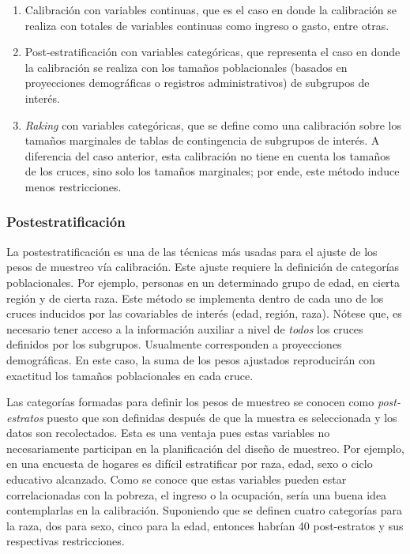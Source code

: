 \documentclass[
  12pt,
  spanish,
]{book}
\providecommand{\tightlist}{%
  \setlength{\itemsep}{0pt}\setlength{\parskip}{0pt}}
\begin{document}
\begin{enumerate}
\def\labelenumi{\arabic{enumi}.}
\tightlist
\item
  Calibración con variables continuas, que es el caso en donde la calibración se realiza con totales de variables continuas como ingreso o gasto, entre otras.
\item
  Post-estratificación con variables categóricas, que representa el caso en donde la calibración se realiza con los tamaños poblacionales (basados en proyecciones demográficas o registros administrativos) de subgrupos de interés.
\item
  \emph{Raking} con variables categóricas, que se define como una calibración sobre los tamaños marginales de tablas de contingencia de subgrupos de interés. A diferencia del caso anterior, esta calibración no tiene en cuenta los tamaños de los cruces, sino solo los tamaños marginales; por ende, este método induce menos restricciones.
\end{enumerate}

\hypertarget{postestratificaciuxf3n}{%
\subsubsection{Postestratificación}\label{postestratificaciuxf3n}}

La postestratificación es una de las técnicas más usadas para el ajuste de los pesos de muestreo vía calibración. Este ajuste requiere la definición de categorías poblacionales. Por ejemplo, personas en un determinado grupo de edad, en cierta región y de cierta raza. Este método se implementa dentro de cada uno de los cruces inducidos por las covariables de interés (edad, región, raza). Nótese que, es necesario tener acceso a la información auxiliar a nivel de \emph{todos} los cruces definidos por los subgrupos. Usualmente corresponden a proyecciones demográficas. En este caso, la suma de los pesos ajustados reproducirán con exactitud los tamaños poblacionales en cada cruce.

Las categorías formadas para definir los pesos de muestreo se conocen como \emph{post-estratos} puesto que son definidas después de que la muestra es seleccionada y los datos son recolectados. Esta es una ventaja pues estas variables no necesariamente participan en la planificación del diseño de muestreo. Por ejemplo, en una encuesta de hogares es difícil estratificar por raza, edad, sexo o ciclo educativo alcanzado. Como se conoce que estas variables pueden estar correlacionadas con la pobreza, el ingreso o la ocupación, sería una buena idea contemplarlas en la calibración. Suponiendo que se definen cuatro categorías para la raza, dos para sexo, cinco para la edad, entonces habrían 40 post-estratos y sus respectivas restricciones.
\end{document}
